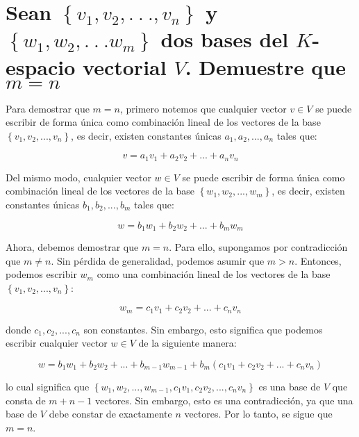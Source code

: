 \section{Sean $\left\{v_1,v_2,.\:.\:.,v_n\right\}$  y  $\left\{w_1,w_2,.\:.\:.w_m\right\}$ dos bases del $K$-espacio vectorial $V$. Demuestre que $m=n$}

Para demostrar que $m=n$, primero notemos que cualquier vector $v\in V$ se puede escribir de forma única como combinación lineal de los vectores de la base $\left\{v_1,v_2,...,v_n\right\}$, es decir, existen constantes únicas $a_1,a_2,...,a_n$ tales que:

$$v=a_1v_1+a_2v_2+...+a_nv_n$$

Del mismo modo, cualquier vector $w\in V$ se puede escribir de forma única como combinación lineal de los vectores de la base $\left\{w_1,w_2,...,w_m\right\}$, es decir, existen constantes únicas $b_1,b_2,...,b_m$ tales que:

$$w=b_1w_1+b_2w_2+...+b_mw_m$$

Ahora, debemos demostrar que $m=n$. Para ello, supongamos por contradicción que $m\neq n$. Sin pérdida de generalidad, podemos asumir que $m>n$. Entonces, podemos escribir $w_m$ como una combinación lineal de los vectores de la base $\left\{v_1,v_2,...,v_n\right\}$:

$$w_m=c_1v_1+c_2v_2+...+c_nv_n$$

donde $c_1,c_2,...,c_n$ son constantes. Sin embargo, esto significa que podemos escribir cualquier vector $w\in V$ de la siguiente manera:

$$w=b_1w_1+b_2w_2+...+b_{m-1}w_{m-1}+b_m(c_1v_1+c_2v_2+...+c_nv_n)$$

lo cual significa que $\left\{w_1,w_2,...,w_{m-1},c_1v_1,c_2v_2,...,c_nv_n\right\}$ es una base de $V$ que consta de $m+n-1$ vectores. Sin embargo, esto es una contradicción, ya que una base de $V$ debe constar de exactamente $n$ vectores. Por lo tanto, se sigue que $m=n$.

